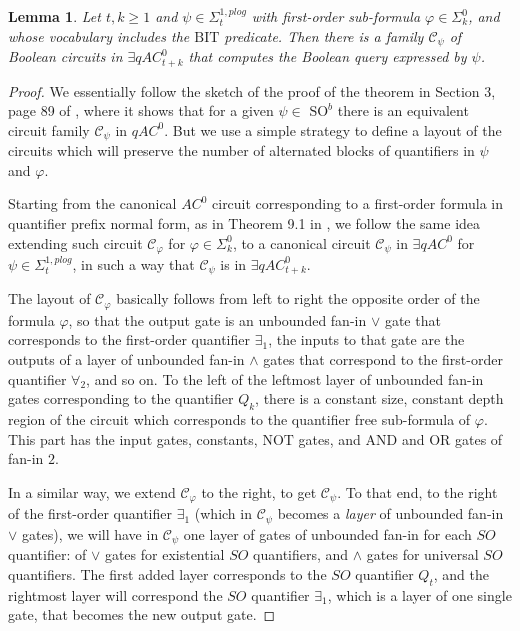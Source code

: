 \documentclass{article}
\newtheorem{lemma}{Lemma}
\begin{document}
\begin{lemma}\label{b}
Let $t,k \ge 1$ and $\psi \in {\Sigma}^{1,\mathit{plog}}_t$ with first-order sub-formula $\varphi \in {\Sigma}^{0}_k$, and whose vocabulary includes the $\mathrm{BIT}$ predicate.
Then there is a family $\mathcal{C}_{\psi}$ of Boolean circuits in $\exists qAC^0_{t+k}$ that computes the Boolean query expressed by $\psi$.

\end{lemma}

\begin{proof}

We essentially follow the sketch of the proof of the theorem in Section 3, page 89 of \cite{Barr92}, where it shows that for a given $\psi \in $ $\mathrm{SO}^{\mathit{b}}$ there is an equivalent circuit family $\mathcal{C}_{\psi}$ in $qAC^0$. But we use a simple strategy to define a layout of the circuits which will preserve the number of alternated blocks of quantifiers in $\psi$ and $\varphi$.

 Starting from the canonical $AC^0$ circuit corresponding to a first-order formula in quantifier prefix normal form, as in Theorem 9.1 in \cite{barrington:jcss1990}, we follow the same idea extending such circuit $\mathcal{C}_{\varphi}$ for $\varphi \in {\Sigma}^{0}_k$, to a canonical circuit $\mathcal{C}_{\psi}$ in $\exists qAC^0$
for $\psi \in {\Sigma}^{1,\mathit{plog}}_t$, in such a way that $\mathcal{C}_{\psi}$ is in $\exists qAC^0_{t+k}$.

The layout of $\mathcal{C}_{\varphi}$ basically follows from left to right the opposite order of the formula $\varphi$, so that the output gate is an unbounded fan-in $\vee$ gate that corresponds to the first-order quantifier $\exists_1$, the inputs to that gate are the outputs of a layer of unbounded fan-in $\wedge$ gates that correspond to the first-order quantifier $\forall_2$, and so on. To the left of the leftmost layer of unbounded fan-in gates corresponding to the quantifier $Q_k$, there is a constant size, constant depth region of the circuit which corresponds to the quantifier free sub-formula of $\varphi$. This part has the input gates, constants, $\mathrm{NOT}$ gates, and  $\mathrm{AND}$ and $\mathrm{OR}$ gates of fan-in $2$.

In a similar way, we extend $\mathcal{C}_{\varphi}$ to the right, to get $\mathcal{C}_{\psi}$. To that end, to the right of the first-order quantifier $\exists_1$ (which in $\mathcal{C}_{\psi}$ becomes a \textit{layer} of unbounded fan-in $\vee$ gates), we will have in $\mathcal{C}_{\psi}$ one layer of  gates of unbounded fan-in for each $SO$ quantifier: of $\vee$ gates for existential $SO$ quantifiers, and $\wedge$ gates for universal $SO$ quantifiers. The first added layer corresponds to the $SO$ quantifier $Q_t$, and the rightmost layer will correspond the $SO$ quantifier $\exists_1$, which is a layer of one single gate, that becomes the new output gate.



\end{proof}
\end{document}
